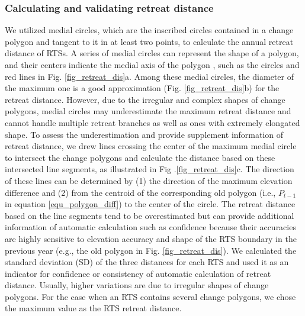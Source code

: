 \documentclass[authoryear,preprint,review,12pt]{elsarticle}
\begin{document}
\subsubsection{Calculating and validating retreat distance}
\label{sec_cal_retreat_dis}

We utilized medial circles, which are the inscribed circles contained in a change polygon and tangent to it in at least two points, to calculate the annual retreat distance of RTSs. 
A series of medial circles can represent the shape of a polygon, and their centers indicate the medial axis of the polygon \citep{zhu2014computing}, such as the circles and red lines in Fig. \ref{fig_retreat_dis}a. 
Among these medial circles, the diameter of the maximum one is a good approximation (Fig. \ref{fig_retreat_dis}b) for the retreat distance.
However, due to the irregular and complex  shapes of change polygons, medial circles may underestimate the maximum retreat distance and cannot handle multiple retreat branches as well as ones with extremely elongated shape. 
To assess the underestimation and provide supplement information of retreat distance, we %
drew lines crossing the center of the maximum medial circle to intersect the change polygons and calculate the distance based on these intersected line segments, as illustrated in Fig .\ref{fig_retreat_dis}c. 
The direction of these lines can be determined by (1) the direction of the maximum elevation difference and (2) from the centroid of the corresponding old polygon (i.e., $P_{t-1}$ in equation \ref{equ_polygon_diff}) to the center of the circle. 
The retreat distance based on the line segments tend to be overestimated but can provide additional information of automatic calculation such as confidence because their accuracies are highly sensitive to elevation accuracy and shape of the RTS boundary in the previous year (e.g., the old polygon in Fig. \ref{fig_retreat_dis}). 
We calculated the standard deviation (SD) of the three distances for each RTS and used it as an indicator for confidence or consistency of automatic calculation of retreat distance. 
Usually, higher variations are due to irregular shapes of change polygons. 
For the case when an RTS contains several change polygons, we chose the maximum value as the RTS retreat distance.
\end{document}
